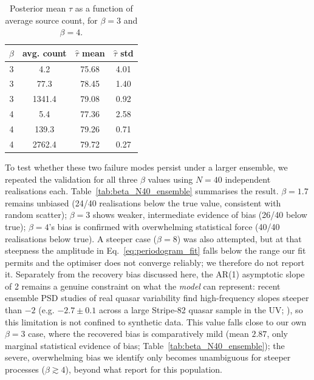 \documentclass{aa}
\begin{document}
            \begin{table}[h]
                \caption{Posterior mean $\tau$ as a function of average source count, for $\beta=3$ and $\beta=4$.}
                \centering
                \begin{tabular}{cccc}
                \hline\hline
                $\beta$ & avg. count & $\hat\tau$ mean & $\hat\tau$ std \\
                \hline
                3 & 4.2 & 75.68 & 4.01 \\
                3 & 77.3 & 78.45 & 1.40 \\
                3 & 1341.4 & 79.08 & 0.92 \\
                4 & 5.4 & 77.36 & 2.58 \\
                4 & 139.3 & 79.26 & 0.71 \\
                4 & 2762.4 & 79.72 & 0.27 \\
                \hline
                \end{tabular}
                \label{tab:beta34_snr_sweep}
            \end{table}
To test whether these two failure modes persist under a larger ensemble, we repeated the validation for all three $\beta$ values using $N=40$ independent realisations each. Table~\ref{tab:beta_N40_ensemble} summarises the result. $\beta=1.7$ remains unbiased (24/40 realisations below the true value, consistent with random scatter); $\beta=3$ shows weaker, intermediate evidence of bias (26/40 below true); $\beta=4$'s bias is confirmed with overwhelming statistical force (40/40 realisations below true). A steeper case ($\beta=8$) was also attempted, but at that steepness the amplitude in Eq.~\ref{eq:periodogram_fit} falls below the range our fit permits and the optimiser does not converge reliably; we therefore do not report it. Separately from the recovery bias discussed here, the AR(1) asymptotic slope of 2 remains a genuine constraint on what the \emph{model} can represent: recent ensemble PSD studies of real quasar variability find high-frequency slopes steeper than $-2$ (e.g. $-2.7\pm0.1$ across a large Stripe-82 quasar sample in the UV; \citealt{Petrecca2026}), so this limitation is not confined to synthetic data. This value falls close to our own $\beta=3$ case, where the recovered bias is comparatively mild (mean $2.87$, only marginal statistical evidence of bias; Table~\ref{tab:beta_N40_ensemble}); the severe, overwhelming bias we identify only becomes unambiguous for steeper processes ($\beta\gtrsim4$), beyond what \citet{Petrecca2026} report for this population. \\
\end{document}
